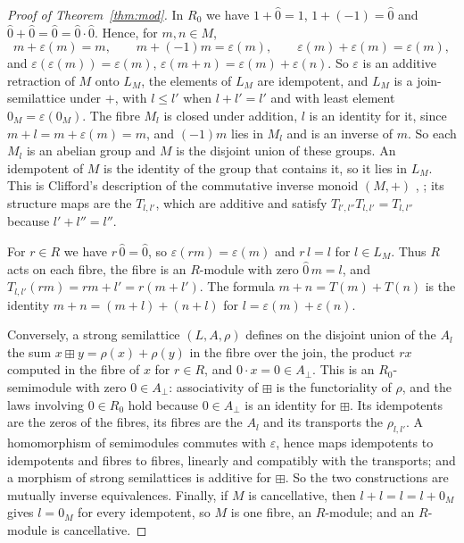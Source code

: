 \documentclass[11pt]{amsart}
\theoremstyle{remark}
\newcommand{\oz}{\widehat{0}}
\begin{document}
\begin{proof}[Proof of Theorem~\ref{thm:mod}]
In $R_0$ we have $1+\oz=1$, $1+(-1)=\oz$ and $\oz+\oz=\oz=\oz\cdot\oz$. Hence, for $m,n\in M$,
\[
m+\varepsilon(m)=m,\qquad m+(-1)m=\varepsilon(m),\qquad\varepsilon(m)+\varepsilon(m)=\varepsilon(m),
\]
and $\varepsilon(\varepsilon(m))=\varepsilon(m)$, $\varepsilon(m+n)=\varepsilon(m)+\varepsilon(n)$. So $\varepsilon$ is an additive retraction of $M$ onto $L_M$, the elements of $L_M$ are idempotent, and $L_M$ is a join-semilattice under $+$, with $l\le l'$ when $l+l'=l'$ and with least element $0_M=\varepsilon(0_M)$. The fibre $M_l$ is closed under addition, $l$ is an identity for it, since $m+l=m+\varepsilon(m)=m$, and $(-1)m$ lies in $M_l$ and is an inverse of $m$. So each $M_l$ is an abelian group and $M$ is the disjoint union of these groups. An idempotent of $M$ is the identity of the group that contains it, so it lies in $L_M$. This is Clifford's description of the commutative inverse monoid $(M,+)$ \cite{Clifford}, \cite[Ch.~4]{Howie}; its structure maps are the $T_{l,l'}$, which are additive and satisfy $T_{l',l''}T_{l,l'}=T_{l,l''}$ because $l'+l''=l''$.

For $r\in R$ we have $r\,\oz=\oz$, so $\varepsilon(rm)=\varepsilon(m)$ and $r\,l=l$ for $l\in L_M$. Thus $R$ acts on each fibre, the fibre is an $R$-module with zero $\oz\,m=l$, and $T_{l,l'}(rm)=rm+l'=r(m+l')$. The formula $m+n=T(m)+T(n)$ is the identity $m+n=(m+l)+(n+l)$ for $l=\varepsilon(m)+\varepsilon(n)$.

Conversely, a strong semilattice $(L,A,\rho)$ defines on the disjoint union of the $A_l$ the sum $x\boxplus y=\rho(x)+\rho(y)$ in the fibre over the join, the product $rx$ computed in the fibre of $x$ for $r\in R$, and $0\cdot x=0\in A_\bot$. This is an $R_0$-semimodule with zero $0\in A_\bot$: associativity of $\boxplus$ is the functoriality of $\rho$, and the laws involving $0\in R_0$ hold because $0\in A_\bot$ is an identity for $\boxplus$. Its idempotents are the zeros of the fibres, its fibres are the $A_l$ and its transports the $\rho_{l,l'}$. A homomorphism of semimodules commutes with $\varepsilon$, hence maps idempotents to idempotents and fibres to fibres, linearly and compatibly with the transports; and a morphism of strong semilattices is additive for $\boxplus$. So the two constructions are mutually inverse equivalences. Finally, if $M$ is cancellative, then $l+l=l=l+0_M$ gives $l=0_M$ for every idempotent, so $M$ is one fibre, an $R$-module; and an $R$-module is cancellative.
\end{proof}
\end{document}
